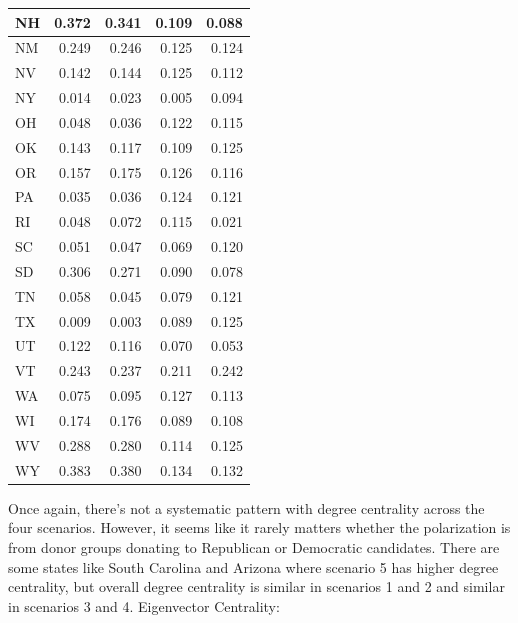 \documentclass[]{article}
\begin{document}
\begin{table}[!h]
\begin{tabular}{l|r|r|r|r}
\hline
\rowcolor{gray!6}  NH & 0.372 & 0.341 & 0.109 & 0.088\\
\hline
NM & 0.249 & 0.246 & 0.125 & 0.124\\
\hline
\rowcolor{gray!6}  NV & 0.142 & 0.144 & 0.125 & 0.112\\
\hline
NY & 0.014 & 0.023 & 0.005 & 0.094\\
\hline
\rowcolor{gray!6}  OH & 0.048 & 0.036 & 0.122 & 0.115\\
\hline
OK & 0.143 & 0.117 & 0.109 & 0.125\\
\hline
\rowcolor{gray!6}  OR & 0.157 & 0.175 & 0.126 & 0.116\\
\hline
PA & 0.035 & 0.036 & 0.124 & 0.121\\
\hline
\rowcolor{gray!6}  RI & 0.048 & 0.072 & 0.115 & 0.021\\
\hline
SC & 0.051 & 0.047 & 0.069 & 0.120\\
\hline
\rowcolor{gray!6}  SD & 0.306 & 0.271 & 0.090 & 0.078\\
\hline
TN & 0.058 & 0.045 & 0.079 & 0.121\\
\hline
\rowcolor{gray!6}  TX & 0.009 & 0.003 & 0.089 & 0.125\\
\hline
UT & 0.122 & 0.116 & 0.070 & 0.053\\
\hline
\rowcolor{gray!6}  VT & 0.243 & 0.237 & 0.211 & 0.242\\
\hline
WA & 0.075 & 0.095 & 0.127 & 0.113\\
\hline
\rowcolor{gray!6}  WI & 0.174 & 0.176 & 0.089 & 0.108\\
\hline
WV & 0.288 & 0.280 & 0.114 & 0.125\\
\hline
\rowcolor{gray!6}  WY & 0.383 & 0.380 & 0.134 & 0.132\\
\hline
\end{tabular}
\end{table}

Once again, there's not a systematic pattern with degree centrality
across the four scenarios. However, it seems like it rarely matters
whether the polarization is from donor groups donating to Republican or
Democratic candidates. There are some states like South Carolina and
Arizona where scenario 5 has higher degree centrality, but overall
degree centrality is similar in scenarios 1 and 2 and similar in
scenarios 3 and 4. Eigenvector Centrality:
\end{document}
